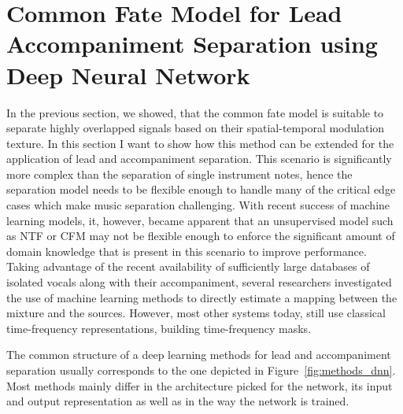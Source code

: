 \section{Common Fate Model for Lead Accompaniment Separation using Deep Neural Network}


In the previous section, we showed, that the common fate model is suitable to separate highly overlapped signals based on their spatial-temporal modulation texture.
In this section I want to show how this method can be extended for the application of lead and accompaniment separation.
This scenario is significantly more complex than the separation of single instrument notes, hence the separation model needs to be flexible enough to handle many of the critical edge cases which make music separation challenging.
With recent success of machine learning models, it, however, became apparent that an unsupervised model such as NTF or CFM may not be flexible enough to enforce the significant amount of domain knowledge that is present in this scenario to improve performance.
Taking advantage of the recent availability of sufficiently large databases of isolated vocals along with their accompaniment, several researchers investigated the use of machine learning methods to directly estimate a mapping between the mixture and the sources.
However, most other systems today, still use classical time-frequency representations, building time-frequency masks.
\par
The common structure of a deep learning methods for lead and accompaniment separation usually corresponds to the one depicted in Figure~\ref{fig:methods_dnn}.
Most methods mainly differ in the architecture picked for the network, its input and output representation as well as in the way the network is trained.

